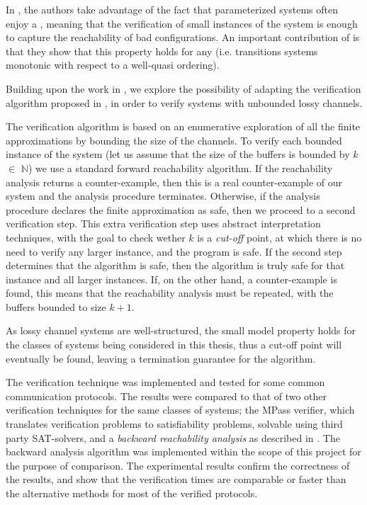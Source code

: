 In \cite{parosh}, the authors take advantage of the fact that parameterized systems often enjoy a , meaning that the verification of small instances of the system is enough to capture the reachability of bad configurations. An important contribution of \cite{parosh} is that they show that this property holds for any \cite{abdulla2010} (i.e. transitions systems monotonic with respect to a well-quasi ordering).


Building upon the work in \cite{parosh}, we explore the possibility of adapting the verification algorithm proposed in \cite{parosh}, in order to verify systems with unbounded lossy channels.

The verification algorithm is based on an enumerative exploration of all the finite approximations by bounding the size of the channels. To verify each bounded instance of the system (let us assume that the size of the buffers is bounded by $k$ $\in$ $\mathds{N}$) we use a standard forward reachability algorithm. If the reachability analysis returns a counter-example, then this is a real counter-example of our system and the analysis procedure terminates. Otherwise, if the analysis procedure declares the finite approximation as safe, then we proceed to a second verification step. This extra verification step uses abstract interpretation techniques\cite{cousot1977}\cite{cousot1979}, with the goal to check wether $k$ is a \emph{cut-off} point, at which there is no need to verify any larger instance, and the program is safe. If the second step determines that the algorithm is safe, then the algorithm is truly safe for that instance and all larger instances. If, on the other hand, a counter-example is found, this means that the reachability analysis must be repeated, with the buffers bounded to size $k+1$.

As lossy channel systems are well-structured, the small model property holds for the classes of systems being considered in this thesis, thus a cut-off point will eventually be found, leaving a termination guarantee for the algorithm.

The verification technique was implemented and tested for some common communication protocols. The results were compared to that of two other verification techniques for the same classes of systems; the MPass\cite{mpass} verifier, which translates verification problems to satisfiability problems, solvable using third party SAT-solvers, and a \emph{backward reachability analysis} as described in \cite{287591}. The backward analysis algorithm was implemented within the scope of this project for the purpose of comparison. The experimental results confirm the correctness of the results, and show that the verification times are comparable or faster than the alternative methods for most of the verified protocols.

